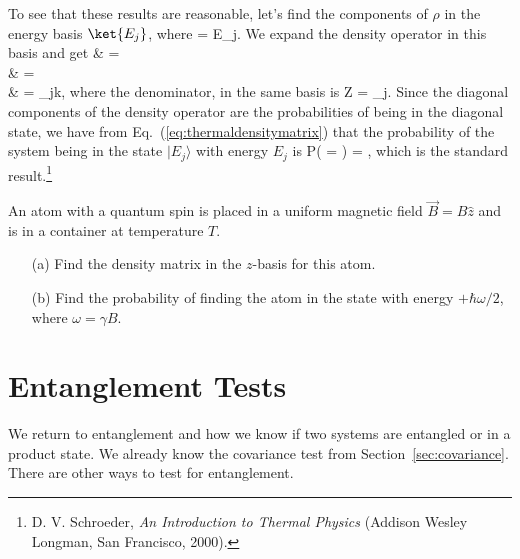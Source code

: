 To see that these results are reasonable, let's find the components of $\rho$ in the energy basis $\ket{E_{j}}$, where
%
\beq
{}  = E_j.
\eeq
%
We expand the density operator in this basis and get
%
\bas
{}\hat{\rho} &  =   \\
&  =     \\
&  =  \delta_{jk},\label{eq:thermaldensitymatrix}
\eas
%
where the denominator, in the same basis is 
%
\beq
Z = \sum_{j}.
\eeq
%
Since the diagonal components of the density operator are the probabilities of being in the diagonal state, we have from Eq.~(\ref{eq:thermaldensitymatrix}) that the probability of the system being in the state $|E_{j}\rangle$ with energy $E_{j}$ is
%
\beq
P(\ket{\Psi} = ) =  ,
\eeq
%
which is the standard result.\footnote{D. V. Schroeder, {\em An Introduction to Thermal Physics} (Addison Wesley Longman, San Francisco, 2000).}

\begin{exercise}
An atom with a quantum spin is placed in a uniform magnetic field $\vec{B} = B\hat{z}$ and is in a container at temperature $T$.  

\begin{enumerate}

\item[(a)] Find the density matrix in the $z$-basis for this atom. 

\item[(b)] Find the probability of finding the atom in the state with energy $+\hbar\omega/2$, where $\omega = \gamma B$.
\end{enumerate}
\end{exercise}


\chapter{Entanglement Tests}

We return to entanglement and how we know if two systems are entangled or in a product state. We already know the covariance test from Section~\ref{sec:covariance}. There are other ways to test for entanglement.

